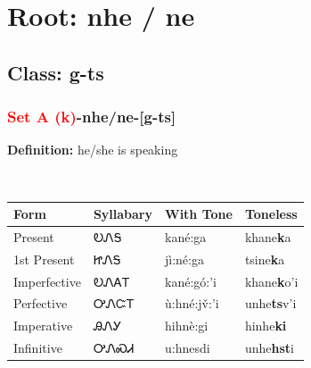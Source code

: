 \needspace{4in}
\section*{Root: nhe / ne}
\nopagebreak
{}
\needspace{3in}
\subsection*{Class: g-ts}
\nopagebreak
\needspace{2in}
\subsubsection*{\textcolor{Red}{Set A (k)}{-}\textbf{nhe/ne}{-}[g-ts]}
\nopagebreak
\textbf{Definition: } he/she is speaking
\\[0.5em]
\begin{tabularx}{\textwidth}{l X X X}%
\toprule%
\textbf{Form}&\textbf{Syllabary}&\textbf{With Tone}&\textbf{Toneless}\\%
\midrule%
Present&ᎧᏁᎦ&kané:ga&khane\textbf{k}a\\%
1st Present&ᏥᏁᎦ&jì:né:ga&tsine\textbf{k}a\\%
Imperfective&ᎧᏁᎪᎢ&kané:gó:’i&khane\textbf{k}o'i\\%
Perfective&ᎤᏁᏨᎢ&ù:hné:jv̌:’i&unhe\textbf{ts}v'i\\%
Imperative&ᎯᏁᎩ&hihnè:gi&hinhe\textbf{ki}\\%
Infinitive&ᎤᏁᏍᏗ&u:hnesdi&unhe\textbf{hst}i\\%
\bottomrule%
\end{tabularx}
\\[1em]